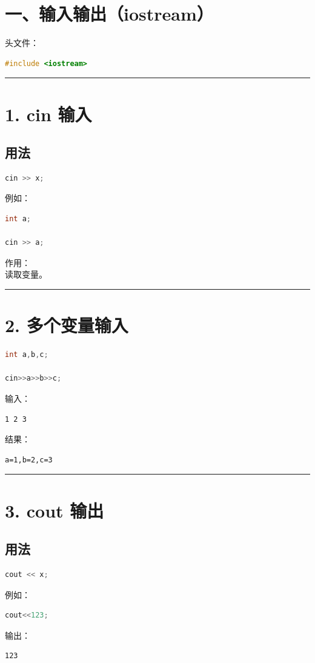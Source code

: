 \documentclass[9pt,twocolumn]{extarticle}
\begin{document}
\section{一、输入输出（iostream）}

头文件：
\begin{lstlisting}[language=C++]
#include <iostream>
\end{lstlisting}

\noindent\rule{\linewidth}{0.4pt}

\section{1. cin 输入}

\subsection{用法}
\begin{lstlisting}[language=C++]
cin >> x;
\end{lstlisting}
例如：
\begin{lstlisting}[language=C++]
int a;

cin >> a;
\end{lstlisting}
作用：\\
读取变量。

\noindent\rule{\linewidth}{0.4pt}

\section{2. 多个变量输入}
\begin{lstlisting}[language=C++]
int a,b,c;

cin>>a>>b>>c;
\end{lstlisting}
输入：
\begin{lstlisting}
1 2 3
\end{lstlisting}
结果：
\begin{lstlisting}
a=1,b=2,c=3
\end{lstlisting}

\noindent\rule{\linewidth}{0.4pt}

\section{3. cout 输出}

\subsection{用法}
\begin{lstlisting}[language=C++]
cout << x;
\end{lstlisting}
例如：
\begin{lstlisting}[language=C++]
cout<<123;
\end{lstlisting}
输出：
\begin{lstlisting}
123
\end{lstlisting}
\end{document}
